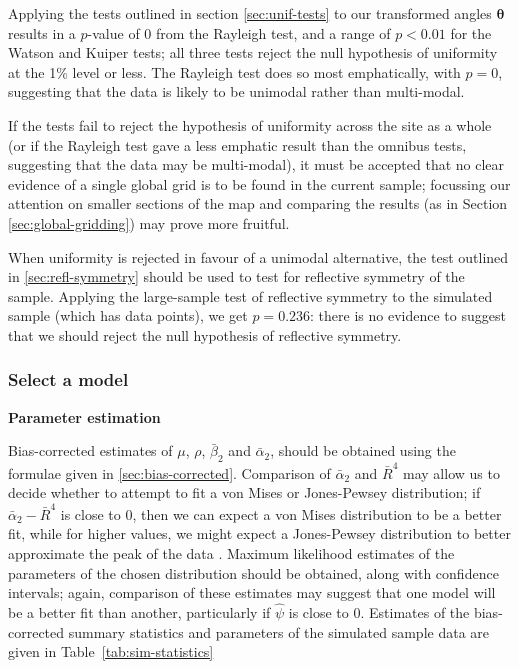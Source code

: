 \documentclass[../../ArchStats.tex]{subfiles}
\begin{document}
Applying the tests outlined in section \ref{sec:unif-tests} to our transformed angles $\boldsymbol{\theta}$ results in a $p$-value of 0 from the Rayleigh test, and a range of $p < 0.01$ for the Watson and Kuiper tests; all three tests reject the null hypothesis of uniformity at the 1\% level or less. The Rayleigh test does so most emphatically, with $p=0$, suggesting that the data is likely to be unimodal rather than multi-modal. 

If the tests fail to reject the hypothesis of uniformity across the site as a whole (or if the Rayleigh test gave a less emphatic result than the omnibus tests, suggesting that the data may be multi-modal), it must be accepted that no clear evidence of a single global grid is to be found in the current sample; focussing our attention on smaller sections of the map and comparing the results (as in Section \ref{sec:global-gridding}) may prove more fruitful. 

When uniformity is rejected in favour of a unimodal alternative, the test outlined in \ref{sec:refl-symmetry} should be used to test for reflective symmetry of the sample. 
Applying the large-sample test of reflective symmetry to the simulated sample (which has  data points), we get $p = 0.236$: there is no evidence to suggest that we should reject the null hypothesis of reflective symmetry.

\subsubsection{Select a model}
\label{sssec:model-selection}

\textbf{Parameter estimation}

Bias-corrected estimates of $\mu$, $\rho$, $\bar{\beta}_2$ and $\bar{\alpha}_2$, should be obtained using the formulae given in \ref{sec:bias-corrected}. Comparison of $\bar{\alpha}_2$ and $\bar{R}^4$ may allow us to decide whether to attempt to fit a von Mises or Jones-Pewsey distribution; if $\bar{\alpha}_2 - \bar{R}^4$ is close to 0, then we can expect a von Mises distribution to be a better fit, while for higher values, we might expect a Jones-Pewsey distribution to better approximate the peak of the data . Maximum likelihood estimates of the parameters of the chosen distribution should be obtained, along with confidence intervals; again, comparison of these estimates may suggest that one model will be a better fit than another, particularly if $\hat{\psi}$ is close to 0. Estimates of the bias-corrected summary statistics and parameters of the simulated sample data are given in Table~\ref{tab:sim-statistics}
\end{document}
